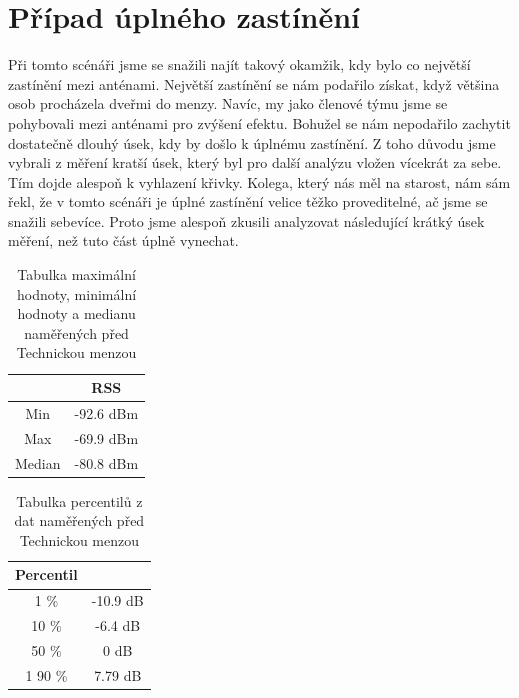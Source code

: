 \section{Případ úplného zastínění}
Při tomto scénáři jsme se snažili najít takový okamžik, kdy bylo co největší zastínění mezi anténami. Největší zastínění se nám podařilo získat, když většina osob procházela dveřmi do menzy. Navíc, my jako členové týmu jsme se pohybovali mezi anténami pro zvýšení efektu. Bohužel se nám nepodařilo zachytit dostatečně dlouhý úsek, kdy by došlo k úplnému zastínění. Z toho důvodu jsme vybrali z měření kratší úsek, který byl pro další analýzu vložen vícekrát za sebe. Tím dojde alespoň k vyhlazení křivky. Kolega, který nás měl na starost, nám sám řekl, že v tomto scénáři je úplné zastínění velice těžko proveditelné, ač jsme se snažili sebevíce. Proto jsme alespoň zkusili analyzovat následující krátký úsek měření, než tuto část úplně vynechat. 



\begin{table}[h!]
\centering
\begin{tabular}{|c|c|}
  \hline
   & RSS \\
  \hline
  Min & -92.6 dBm\\
  \hline
  Max & -69.9 dBm\\
  \hline
  Median & -80.8 dBm \\
  \hline
\end{tabular}
\caption{Tabulka maximální hodnoty, minimální hodnoty a medianu naměřených před Technickou menzou}
\end{table}

\clearpage

\begin{table}[h!]
\centering
\begin{tabular}{|c|c|}
  \hline
   Percentil &  \\
  \hline
  1 \% & -10.9 dB\\
  \hline
  10 \% & -6.4 dB\\
  \hline
  50 \% & 0 dB \\
  \hline1 
  90 \% & 7.79 dB \\
  \hline
\end{tabular}
\caption{Tabulka percentilů z dat naměřených před Technickou menzou}
\end{table}



